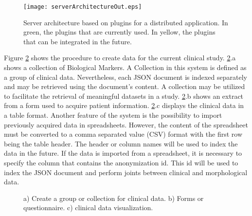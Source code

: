 \documentclass[]{spie}  %
\begin{document}
\begin{figure}
	\centering 
	\texttt{[image: serverArchitectureOut.eps]}
	\caption[Server architecture]{Server architecture based on plugins for a distributed application. In green, the plugins that are currently used. In yellow, the plugins that can be integrated in the future.}
	\label{fig:serverArchitectureOut}
\end{figure} 

Figure \ref{fig:gnerateClinicalData} shows the procedure to create data for the current clinical study. 
\ref{fig:gnerateClinicalData}.a shows a collection of Biological Markers. A Collection in this system is defined as a group of clinical data. Nevertheless, 
each JSON document is indexed separately and may be retrieved using the document's content. A collection may be utilized to facilitate the retrieval of meaningful datasets in a study. \ref{fig:gnerateClinicalData}.b shows an extract from a form used to acquire patient information. 
\ref{fig:gnerateClinicalData}.c displays the clinical data in a table format. Another feature of the system is the possibility to import previously acquired data in spreadsheets. However, the content of the spreadsheet must be converted to a comma separated value (CSV) format with the first row being the table header. The header or column names will be used to index the data in the future. If the data is imported from a spreadsheet, it is necessary to specify the column that contains the anonymization id. This id will be used to index the JSON document and perform joints between clinical and morphological data.

\begin{figure}
	\centering 
	\caption[Import and generate clinical data]{a) Create a group or collection for clinical data. b) Forms or questionnaire. c) clinical data visualization.}
	\label{fig:gnerateClinicalData}
\end{figure} 
\end{document}
